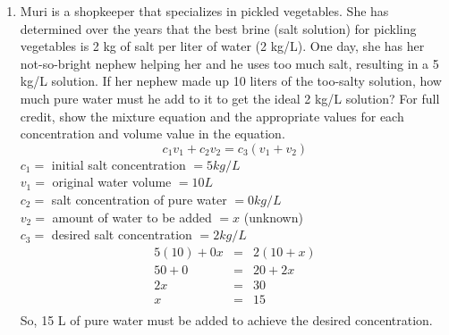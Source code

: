 \documentclass[letterpaper,12pt,fleqn]{article}
\begin{document}
\begin{enumerate}
\item Muri is a shopkeeper that specializes in pickled vegetables. She has
determined over the years that the best brine (salt solution) for pickling
vegetables is 2 kg of salt per liter of water (2 kg/L).  One day, she has her
not-so-bright nephew helping her and he uses too much salt, resulting in
a 5 kg/L solution.  If her nephew made up 10 liters of the too-salty solution,
how much pure water must he add to it to get the ideal 2 kg/L solution? For
full credit, show the mixture equation and the appropriate values for each
concentration and volume value in the equation.
\[c_1v_1+c_2v_2=c_3(v_1+v_2)\]
$c_1=$ initial salt concentration $=5 kg/L$ \\
$v_1=$ original water volume $=10 L$ \\
$c_2=$ salt concentration of pure water $=0 kg/L$ \\
$v_2=$ amount of water to be added $=x$ (unknown) \\
$c_3=$ desired salt concentration $=2 kg/L$ \\
\begin{eqnarray*}
5(10)+0x &=& 2(10+x) \\
50+0 &=& 20+2x \\
2x &=& 30 \\
x &=& 15 \\
\end{eqnarray*}
So, 15 L of pure water must be added to achieve the desired concentration.
\end{enumerate}
\end{document}
